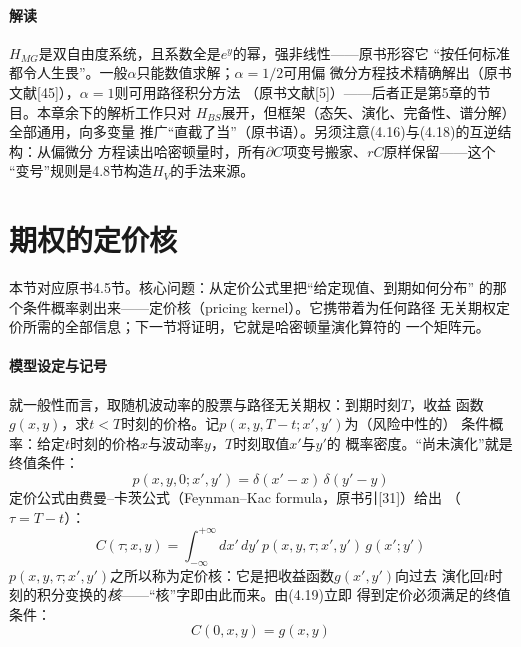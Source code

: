 \paragraph{解读}
$H_{MG}$是双自由度系统，且系数全是$e^{y}$的幂，强非线性——原书形容它
“按任何标准都令人生畏”。一般$\alpha$只能数值求解；$\alpha=1/2$可用偏
微分方程技术精确解出（原书文献[45]），$\alpha=1$则可用路径积分方法
（原书文献[5]）——后者正是第5章的节目。本章余下的解析工作只对
$H_{BS}$展开，但框架（态矢、演化、完备性、谱分解）全部通用，向多变量
推广“直截了当”（原书语）。另须注意(4.16)与(4.18)的互逆结构：从偏微分
方程读出哈密顿量时，所有$\partial C$项变号搬家、$rC$原样保留——这个
“变号”规则是4.8节构造$H_{V}$的手法来源。

\section{期权的定价核}

本节对应原书4.5节。核心问题：从定价公式里把“给定现值、到期如何分布”
的那个条件概率剥出来——定价核（pricing kernel）。它携带着为任何路径
无关期权定价所需的全部信息；下一节将证明，它就是哈密顿量演化算符的
一个矩阵元。

\paragraph{模型设定与记号}
就一般性而言，取随机波动率的股票与路径无关期权：到期时刻$T$，收益
函数$g(x,y)$，求$t<T$时刻的价格。记$p(x,y,T-t;x',y')$为（风险中性的）
条件概率：给定$t$时刻的价格$x$与波动率$y$，$T$时刻取值$x'$与$y'$的
概率密度。“尚未演化”就是终值条件：
\begin{equation*}
p(x,y,0;x',y')=\delta(x'-x)\,\delta(y'-y)
\tag{4.19}
\end{equation*}
定价公式由费曼--卡茨公式（Feynman--Kac formula，原书引[31]）给出
（$\tau=T-t$）：
\begin{equation*}
C(\tau;x,y)=\int_{-\infty}^{+\infty}dx'\,dy'\,
p(x,y,\tau;x',y')\,g(x';y')
\tag{4.20}
\end{equation*}
$p(x,y,\tau;x',y')$之所以称为定价核：它是把收益函数$g(x',y')$向过去
演化回$t$时刻的积分变换的\emph{核}——“核”字即由此而来。由(4.19)立即
得到定价必须满足的终值条件：
\begin{equation*}
C(0,x,y)=g(x,y)
\tag{4.21}
\end{equation*}

